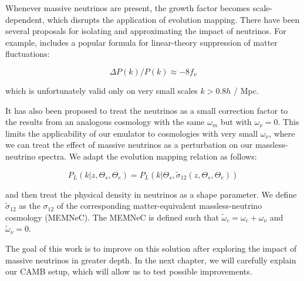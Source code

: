 Whenever massive neutrinos are present, the growth factor becomes scale-
dependent, which disrupts the application of evolution mapping. There have
been several proposals for isolating and approximating the impact of 
neutrinos. For example, \citet{Kiakotou} includes a popular formula for
linear-theory suppression of matter fluctuations:

\begin{equation}
\Delta P(k) / P(k) \approx -8 f_\nu
\end{equation}

which is unfortunately valid only on very small scales $k > 0.8 h$ / Mpc.

It has also been proposed to treat the neutrinos as a small correction factor
to the results from an analogous cosmology with the same $\omega_m$ but with
$\omega_\nu = 0$. This limits the applicability of our emulator to
cosmologies with very small $\omega_\nu$, where we can treat the effect of
massive neutrinos as a perturbation on our massless-neutrino spectra. We adapt 
the evolution mapping relation as follows:

\begin{equation}
\label{eq: evMapping_modded}
    P_L (k | z, \Theta_s, \Theta_e)
    =
    P_L (k | \Theta_s,
    		\tilde{\sigma}_{12} \left( z, \Theta_s, \Theta_e \right))
\end{equation}


and then treat the physical density in neutrinos as a shape parameter.
We define $\tilde{\sigma}_{12}$ as the $\sigma_{12}$ of the corresponding 
matter-equivalent massless-neutrino cosmology (MEMNeC). The MEMNeC is
defined such that $\tilde{\omega}_c = \omega_c + \omega_\nu$ and
$\tilde{\omega}_\nu = 0$.

The goal of this work is to improve on this solution after exploring the 
impact 
of massive neutrinos in greater depth. In the next chapter, we will carefully 
explain our CAMB setup, which will allow us to test possible improvements.